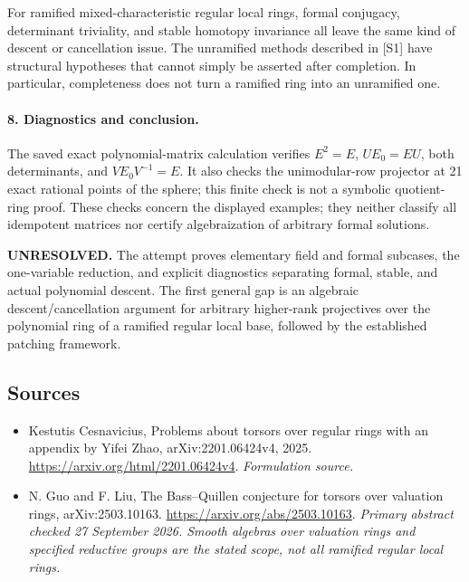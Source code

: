 \documentclass[11pt]{article}
\begin{document}
For ramified mixed-characteristic regular local rings, formal conjugacy, determinant triviality, and stable homotopy invariance all leave the same kind of descent or cancellation issue. The unramified methods described in [S1] have structural hypotheses that cannot simply be asserted after completion. In particular, completeness does not turn a ramified ring into an unramified one.

\paragraph{8. Diagnostics and conclusion.}
The saved exact polynomial-matrix calculation verifies $E^2=E$, $UE_0=EU$, both determinants, and $VE_0V^{-1}=E$. It also checks the unimodular-row projector at 21 exact rational points of the sphere; this finite check is not a symbolic quotient-ring proof. These checks concern the displayed examples; they neither classify all idempotent matrices nor certify algebraization of arbitrary formal solutions.

\textbf{UNRESOLVED.} The attempt proves elementary field and formal subcases, the one-variable reduction, and explicit diagnostics separating formal, stable, and actual polynomial descent. The first general gap is an algebraic descent/cancellation argument for arbitrary higher-rank projectives over the polynomial ring of a ramified regular local base, followed by the established patching framework.

\subsection{Sources}
\begin{itemize}
\item[S1]Kestutis Cesnavicius, Problems about torsors over regular rings with an appendix by Yifei Zhao, arXiv:2201.06424v4, 2025.
\url{https://arxiv.org/html/2201.06424v4}.
\textit{Formulation source.}
\item[E1]N. Guo and F. Liu, The Bass--Quillen conjecture for torsors over valuation rings, arXiv:2503.10163.
\url{https://arxiv.org/abs/2503.10163}.
\textit{Primary abstract checked 27 September 2026. Smooth algebras over valuation rings and specified reductive groups are the stated scope, not all ramified regular local rings.}
\end{itemize}
\end{document}
